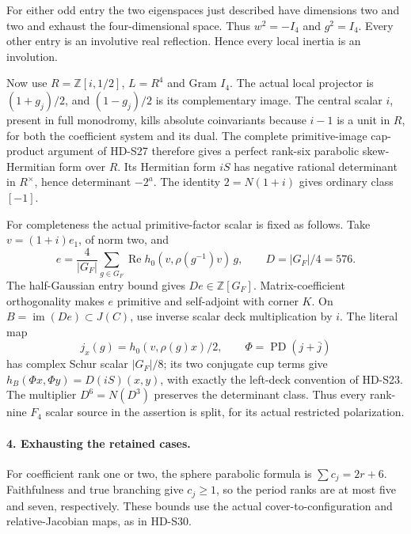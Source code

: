 For either odd entry the two eigenspaces just described
have dimensions two and two and exhaust the four-dimensional
space. Thus \(w^2=-I_4\) and \(g^2=I_4\).
Every other entry is an involutive real reflection.
Hence every local inertia is an involution.

Now use \(R=\mathbb Z[i,1/2]\), \(L=R^4\) and Gram
\(I_4\). The actual local projector is \((1+g_j)/2\),
and \((1-g_j)/2\) is its complementary image. The central
scalar \(i\), present in full monodromy, kills absolute
coinvariants because \(i-1\) is a unit in \(R\), for both
the coefficient system and its dual. The complete primitive-image
cap-product argument of HD-S27 therefore gives a perfect
rank-six parabolic skew-Hermitian form over \(R\).
Its Hermitian form \(iS\) has negative rational determinant
in \(R^\times\), hence determinant \(-2^a\).
The identity \(2=N(1+i)\) gives ordinary class \([-1]\).

For completeness the actual primitive-factor scalar is
fixed as follows. Take \(v=(1+i)e_1\), of norm two,
and
\[
 e=\frac4{|G_F|}\sum_{g\in G_F}
       \operatorname{Re}h_0(v,\rho(g^{-1})v)\,g,
 \qquad D=|G_F|/4=576.
\]
The half-Gaussian entry bound gives \(De\in\mathbb Z[G_F]\).
Matrix-coefficient orthogonality makes \(e\) primitive and
self-adjoint with corner \(K\). On
\(B=\operatorname{im}(De)\subset J(C)\), use inverse
scalar deck multiplication by \(i\).
The literal map
\[
 j_x(g)=h_0(v,\rho(g)x)/2,\qquad
                \Phi=\operatorname{PD}(j+\bar j)
\]
has complex Schur scalar \(|G_F|/8\); its two conjugate
cup terms give
\(h_B(\Phi x,\Phi y)=D(iS)(x,y)\), with exactly the
left-deck convention of HD-S23. The multiplier
\(D^6=N(D^3)\) preserves the determinant class.
Thus every rank-nine \(F_4\) scalar source in the assertion
is split, for its actual restricted polarization.

\paragraph{4. Exhausting the retained cases.}
For coefficient rank one or two, the sphere parabolic formula
is \(\sum c_j=2r+6\). Faithfulness and true branching give
\(c_j\ge1\), so the period ranks are at most five and seven,
respectively. These bounds use the actual cover-to-configuration
and relative-Jacobian maps, as in HD-S30.

